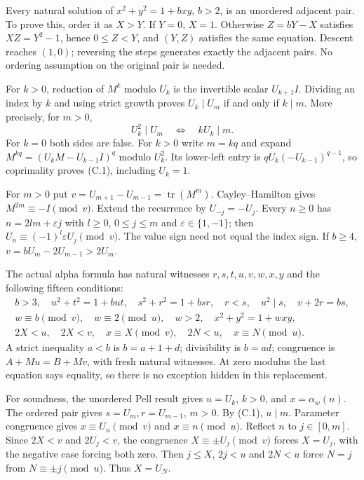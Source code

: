 \documentclass[11pt]{article}
\theoremstyle{definition}
\theoremstyle{remark}
\begin{document}
Every natural solution of $x^2+y^2=1+bxy$, $b>2$, is an unordered
adjacent pair. To prove this, order it as $X>Y$. If $Y=0$, $X=1$.
Otherwise $Z=bY-X$ satisfies $XZ=Y^2-1$, hence $0\le Z<Y$,
and $(Y,Z)$ satisfies the same equation. Descent reaches $(1,0)$;
reversing the steps generates exactly the adjacent pairs.
No ordering assumption on the original pair is needed.

For $k>0$, reduction of $M^k$ modulo $U_k$ is the invertible scalar
$U_{k+1}I$. Dividing an index by $k$ and using strict growth proves
$U_k\mid U_m$ if and only if $k\mid m$. More precisely, for $m>0$,
\[
                    U_k^2\mid U_m\quad\Longleftrightarrow\quad
                         kU_k\mid m.                           \tag{C.1}
\]
For $k=0$ both sides are false. For $k>0$ write $m=kq$ and expand
$M^{kq}=(U_kM-U_{k-1}I)^q$ modulo $U_k^2$. Its lower-left entry is
$qU_k(-U_{k-1})^{q-1}$, so coprimality proves (C.1), including $U_k=1$.

For $m>0$ put $v=U_{m+1}-U_{m-1}=\operatorname{tr}(M^m)$.
Cayley--Hamilton gives $M^{2m}\equiv-I\pmod v$.
Extend the recurrence by $U_{-j}=-U_j$. Every $n\ge0$ has
$n=2lm+\varepsilon j$ with $l\ge0$, $0\le j\le m$ and
$\varepsilon\in\{1,-1\}$; then
$U_n\equiv(-1)^l\varepsilon U_j\pmod v$.
The value sign need not equal the index sign. If $b\ge4$,
$v=bU_m-2U_{m-1}>2U_m$.

The actual alpha formula has natural witnesses $r,s,t,u,v,w,x,y$
and the following fifteen conditions:
\[
\begin{gathered}
 b>3,\quad u^2+t^2=1+but,\quad s^2+r^2=1+bsr,\quad r<s,\quad
 u^2\mid s,\quad v+2r=bs,\\
 w\equiv b\pmod v,\quad w\equiv2\pmod u,\quad w>2,\quad
 x^2+y^2=1+wxy,\\
 2X<u,\quad2X<v,\quad x\equiv X\pmod v,\quad
 2N<u,\quad x\equiv N\pmod u.
\end{gathered}                                                   \tag{C.2}
\]
A strict inequality $a<b$ is $b=a+1+d$; divisibility is $b=ad$;
congruence is $A+Mu=B+Mv$, with fresh natural witnesses.
At zero modulus the last equation says equality, so there is no
exception hidden in this replacement.

For soundness, the unordered Pell result gives $u=U_k$, $k>0$,
and $x=\alpha_w(n)$. The ordered pair gives $s=U_m,r=U_{m-1}$,
$m>0$. By (C.1), $u\mid m$. Parameter congruence gives
$x\equiv U_n\pmod v$ and $x\equiv n\pmod u$.
Reflect $n$ to $j\in[0,m]$. Since $2X<v$ and $2U_j<v$,
the congruence $X\equiv\pm U_j\pmod v$ forces $X=U_j$,
with the negative case forcing both zero.
Then $j\le X$, $2j<u$ and $2N<u$ force $N=j$ from
$N\equiv\pm j\pmod u$. Thus $X=U_N$.
\end{document}
